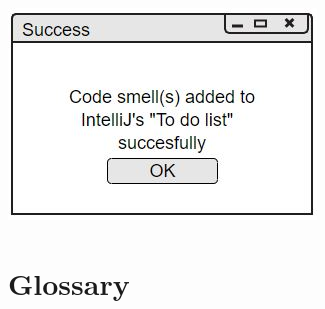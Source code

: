 \documentclass[11pt]{article}
\begin{document}
			\centering	
			\includegraphics[scale=0.9]{pop-up_remind.jpg}\\
						
		\flushleft	
		\section{Glossary}
		
		
	
\end{document}

